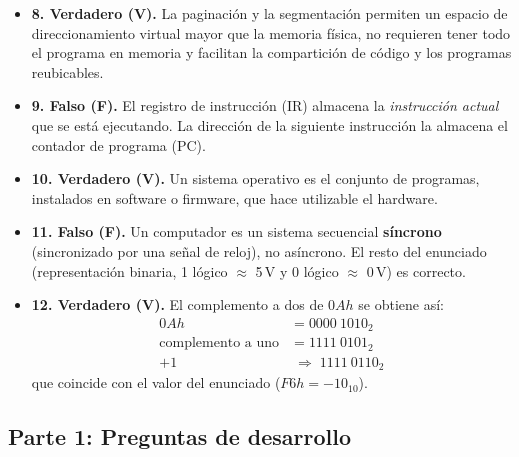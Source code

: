 \documentclass[10pt]{article}
\begin{document}
\begin{itemize}
  \item \textbf{8. Verdadero (V).} La paginación y la segmentación permiten un espacio de direccionamiento virtual mayor que la memoria física, no requieren tener todo el programa en memoria y facilitan la compartición de código y los programas reubicables.

  \item \textbf{9. Falso (F).} El registro de instrucción (IR) almacena la \emph{instrucción actual} que se está ejecutando. La dirección de la siguiente instrucción la almacena el contador de programa (PC).

  \item \textbf{10. Verdadero (V).} Un sistema operativo es el conjunto de programas, instalados en software o firmware, que hace utilizable el hardware.

  \item \textbf{11. Falso (F).} Un computador es un sistema secuencial \textbf{síncrono} (sincronizado por una señal de reloj), no asíncrono. El resto del enunciado (representación binaria, 1 lógico $\approx$ 5\,V y 0 lógico $\approx$ 0\,V) es correcto.

  \item \textbf{12. Verdadero (V).} El complemento a dos de $0Ah$ se obtiene así:
  \begin{align*}
    0Ah &= 0000\ 1010_2 \\
    \text{complemento a uno} &= 1111\ 0101_2 \\
    +1 &\;\Rightarrow\; 1111\ 0110_2
  \end{align*}
  que coincide con el valor del enunciado ($F6h = -10_{10}$).
\end{itemize}

\subsection{Parte 1: Preguntas de desarrollo}
\end{document}
